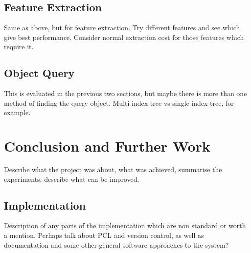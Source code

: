 \documentclass[11pt,a4paper]{kth-mag}
\begin{document}
\section{Feature Extraction}
Same as above, but for feature extraction. Try different features and see which
give best performance. Consider normal extraction cost for those features which
require it.
\section{Object Query}
This is evaluated in the previous two sections, but maybe there is more than one
method of finding the query object. Multi-index tree vs single index tree, for
example.
\chapter{Conclusion and Further Work}
\label{chap:conc}
Describe what the project was about, what was achieved, summarise the
experiments, describe what can be improved.

\begin{appendices}
  \chapter{Implementation}
  \label{chap:impl}
  Description of any parts of the implementation which are non standard or worth a
  mention. Perhaps talk about PCL and version control, as well as documentation
  and some other general software approaches to the system?
\end{appendices}
\printbibliography
\end{document}
